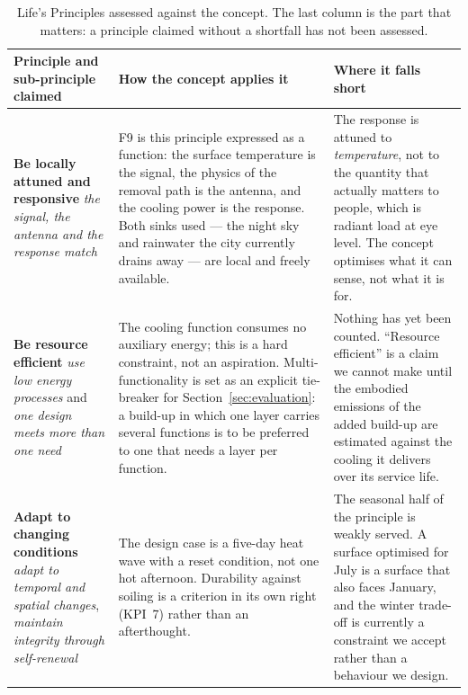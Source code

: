 \begin{table}[htbp]
\centering
\caption{Life's Principles assessed against the concept. The last column is the
part that matters: a principle claimed without a shortfall has not been
assessed.}
\label{tab:lpassess}
\renewcommand{\arraystretch}{1.3}
\footnotesize
\begin{tabularx}{\textwidth}{L{3.2cm} L{4.4cm} X}
\toprule
\textbf{Principle and sub-principle claimed} & \textbf{How the concept applies it} & \textbf{Where it falls short} \\
\midrule
\textbf{Be locally attuned and responsive} \newline \emph{the signal, the antenna and the response match}
& F9 is this principle expressed as a function: the surface temperature is the
signal, the physics of the removal path is the antenna, and the cooling power is
the response. Both sinks used --- the night sky and rainwater the city currently
drains away --- are local and freely available.
& The response is attuned to \emph{temperature}, not to the quantity that
actually matters to people, which is radiant load at eye level. The concept
optimises what it can sense, not what it is for.  \\

\textbf{Be resource efficient} \newline \emph{use low energy processes} and \emph{one design meets more than one need}
& The cooling function consumes no auxiliary energy; this is a hard constraint,
not an aspiration. Multi-functionality is set as an explicit tie-breaker for
Section~\ref{sec:evaluation}: a build-up in which one layer carries several
functions is to be preferred to one that needs a layer per function.
& Nothing has yet been counted. \enquote{Resource efficient} is a claim we cannot
make until the embodied emissions of the added build-up are estimated against the
cooling it delivers over its service life. \\

\textbf{Adapt to changing conditions} \newline \emph{adapt to temporal and spatial changes}, \emph{maintain integrity through self-renewal}
& The design case is a five-day heat wave with a reset condition, not one hot
afternoon. Durability against soiling is a criterion in its own right (KPI~7)
rather than an afterthought.
& The seasonal half of the principle is weakly served. A surface optimised for
July is a surface that also faces January, and the winter trade-off is currently
a constraint we accept rather than a behaviour we design. \\


\end{tabularx}
\end{table}
